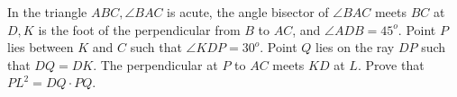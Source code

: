 In the triangle $ABC, \angle  BAC$ is acute, the angle bisector of $\angle  BAC$ meets $BC$ at $D, K$ is the foot of the perpendicular from $B$ to $AC$, and $\angle ADB = 45^o$. Point $P$ lies between $K$ and $C$ such that $\angle KDP = 30^o$. Point $Q$ lies on the ray $DP$ such that  $DQ = DK$. The perpendicular at $P$ to $AC$ meets $KD$ at $L$. Prove that $PL^2 = DQ \cdot PQ$.